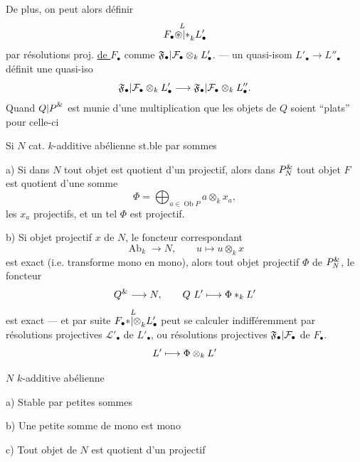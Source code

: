 De plus, on peut alors définir
\[
F_\bullet\overset{L}{{\circledast|*}}_kL'_\bullet
\]
par résolutions proj. \uline{de $F_\bullet$} comme
${\mathfrak F_\bullet|\mathcal F_\bullet}\otimes_kL'_\bullet$.
--- un quasi-isom $L'_\bullet\to L''_\bullet$ définit une quasi-iso
\[
{\mathfrak F_\bullet|\mathcal F_\bullet}\otimes_kL'_\bullet
\longrightarrow
{\mathfrak F_\bullet|\mathcal F_\bullet}\otimes_kL''_\bullet.
\]
Quand ${Q|P}^{{\&}}$ est munie d'une multiplication
 que les objets de $Q$ soient ``plats'' pour celle-ci


\unsure{(*)} Si $N$ cat. $k$-additive abélienne
st.ble par   sommes

a) Si dans $N$ tout objet est quotient d'un projectif, alors dans
$P_N^{{\&}}$ tout objet $F$ est quotient d'une somme
\[
\Phi=\bigoplus_{a\in\operatorname{Ob}P}a\otimes_kx_a,
\]
les $x_a$ projectifs, et un tel $\Phi$ est projectif.

b) Si    objet projectif
 $x$ de $N$, le foncteur correspondant
\[
\operatorname{Ab}_k\longrightarrow N,\qquad u\longmapsto u\otimes_kx
\]
est exact (i.e. transforme mono en mono), alors
 
tout objet projectif $\Phi$ de 
$P_N^{{\&}}$, le foncteur
\[
Q^{{\&}}\longrightarrow N,\qquad
{{Q}}\ L'\longmapsto\Phi *_kL'
\]
est exact --- et par suite
$F_\bullet\overset L{{*|\otimes}}_kL'_\bullet$
peut se calculer indifféremment par résolutions projectives
$\mathcal L'_\bullet$ de $L'_\bullet$, ou résolutions projectives
${\mathfrak F_\bullet|\mathcal F_\bullet}$ de $F_\bullet$.
\[
{L'\longmapsto\Phi\otimes_kL'}
\]

$N$ $k$-additive abélienne

a) Stable par petites sommes

b) Une petite somme de mono est mono

c) Tout objet de $N$ est quotient d'un projectif

